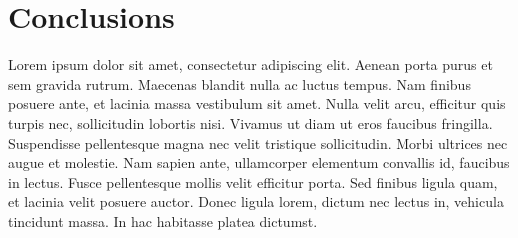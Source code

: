 \documentclass[12pt]{article}
\theoremstyle{definition}
\begin{document}

\section*{\centering Conclusions}

Lorem ipsum dolor sit amet, consectetur adipiscing elit.
Aenean porta purus et sem gravida rutrum.
Maecenas blandit nulla ac luctus tempus.
Nam finibus posuere ante, et lacinia massa vestibulum sit amet.
Nulla velit arcu, efficitur quis turpis nec, sollicitudin lobortis nisi.
Vivamus ut diam ut eros faucibus fringilla.
Suspendisse pellentesque magna nec velit tristique sollicitudin.
Morbi ultrices nec augue et molestie.
Nam sapien ante, ullamcorper elementum convallis id, faucibus in lectus.
Fusce pellentesque mollis velit efficitur porta.
Sed finibus ligula quam, et lacinia velit posuere auctor.
Donec ligula lorem, dictum nec lectus in, vehicula tincidunt massa.
In hac habitasse platea dictumst.


\newpage

\begin{center}
\printbibliography[heading=bibintoc]
\end{center}

\end{document}
